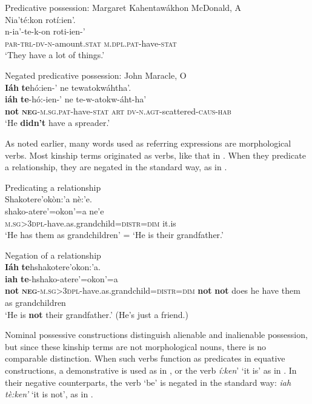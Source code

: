 \documentclass[output=paper,colorlinks,citecolor=brown]{langscibook}
\begin{document}
\ea\label{ex:moh:47}Predicative possession: Margaret Kahentawákhon McDonald, A\\
    \glll Nia’té:kon rotí:ien’. \\
         n-ia’-te-k-on roti-ien-’ \\
         \textsc{par-trl-dv-n-}amount.\textsc{stat} \textsc{m.dpl.pat}-have-\textsc{stat}\\
    \glt ‘They have a lot of things.’
\z

\newpage
\ea\label{ex:moh:48}Negated predicative possession: John Maracle, O\\
    \glll \textbf{Iáh} \textbf{te}hó:ien-’ ne tewatokwáhtha’. \\
         \textbf{iáh} \textbf{te}-hó:-ien-’ ne te-w-atokw-áht-ha’ \\
         \textbf{not} \textsc{\textbf{neg}-m.sg.pat}-have-\textsc{stat} \textsc{art} \textsc{dv-n.agt}-scattered-\textsc{caus-hab}\\
    \glt ‘He \textbf{didn’t} have a spreader.’
\z

As noted earlier, many words used as referring expressions are morphological verbs. Most kinship terms originated as verbs, like that in . When they predicate a relationship, they are negated in the standard way, as in . 

\ea\label{ex:moh:49}Predicating a relationship\\
    \glll Shakotere’okòn:’a nè:’e.\\
         shako-atere’=okon’=a ne’e \\
         \textsc{m.sg>3dpl}-have.as.grandchild=\textsc{distr=dim} it.is\\
    \glt ‘He has them as grandchildren’ = ‘He is their grandfather.’
\z

\ea\label{ex:moh:50} Negation of a relationship\\
    \glll \textbf{Iáh} \textbf{te}hshakotere’okon:’a.\\
         \textbf{iah} \textbf{te}-hshako-atere’=okon’=a\\
         \textbf{not} \textbf{\textsc{neg}}\textsc{-m.sg>3dpl}-have.as.grandchild=\textsc{distr=dim} \textbf{not} \textbf{not} does he have them as grandchildren \\
    \glt ‘He is \textbf{not} their grandfather.’ (He’s just a friend.)
\z

Nominal possessive constructions distinguish alienable and inalienable possession, but since these kinship terms are not morphological nouns, there is no comparable distinction. When such verbs function as predicates in equative constructions, a demonstrative is used as in , or the verb \textit{í:ken}’ ‘it is’ as in . In their negative counterparts, the verb ‘be’ is negated in the standard way: \textit{iah tè:ken’} ‘it is not’, as in .
\end{document}
